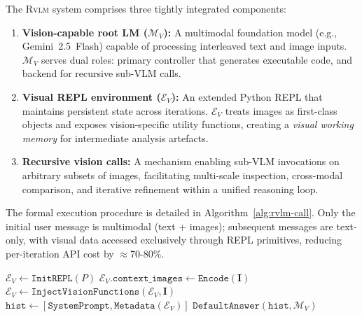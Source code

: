 \documentclass{article}
\newcommand{\RVLM}{\textsc{Rvlm}}
\begin{document}
	The \RVLM{} system comprises three tightly integrated components:
	\begin{enumerate}[leftmargin=*,itemsep=2pt]
		\item \textbf{Vision-capable root LM ($\mathcal{M}_V$):} A multimodal
		foundation model (e.g., Gemini~2.5~Flash) capable of processing
		interleaved text and image inputs.
		$\mathcal{M}_V$ serves dual roles: primary controller that generates
		executable code, and backend for recursive sub-VLM calls.
		
		\item \textbf{Visual REPL environment ($\mathcal{E}_V$):} An extended
		Python REPL that maintains persistent state across iterations.
		$\mathcal{E}_V$ treats images as first-class objects and exposes
		vision-specific utility functions, creating a \emph{visual working
			memory} for intermediate analysis artefacts.
		
		\item \textbf{Recursive vision calls:} A mechanism enabling sub-VLM
		invocations on arbitrary subsets of images, facilitating multi-scale
		inspection, cross-modal comparison, and iterative refinement within
		a unified reasoning loop.
	\end{enumerate}
	
	The formal execution procedure is detailed in Algorithm~\ref{alg:rvlm-call}.
	Only the initial user message is multimodal (text + images); subsequent
	messages are text-only, with visual data accessed exclusively through REPL
	primitives, reducing per-iteration API cost by ${\approx}$70-80\%.
	
	\begin{algorithm}[h]
		\caption{\RVLM{}: Recursive Vision-Language Model}
		\label{alg:rvlm-call}
		$\mathcal{E}_V \gets \texttt{InitREPL}(P)$\;
		$\mathcal{E}_V.\texttt{context\_images} \gets \texttt{Encode}(\mathbf{I})$\;
		$\mathcal{E}_V \gets \texttt{InjectVisionFunctions}(\mathcal{E}_V, \mathbf{I})$
		$\texttt{hist} \gets [\texttt{SystemPrompt}, \texttt{Metadata}(\mathcal{E}_V)]$\;
		\Return $\texttt{DefaultAnswer}(\texttt{hist}, \mathcal{M}_V)$\;
	\end{algorithm}
	
\end{document}
